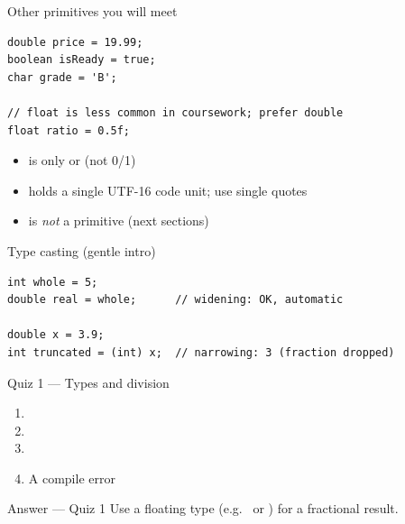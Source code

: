 \documentclass[aspectratio=169,11pt]{beamer}
\begin{document}
    \begin{frame}[fragile]{Other primitives you will meet}
        \begin{lstlisting}
double price = 19.99;
boolean isReady = true;
char grade = 'B';

// float is less common in coursework; prefer double
float ratio = 0.5f;
        \end{lstlisting}
        \vspace{0.3em}
        \begin{itemize}
            \item {} is only  or  (not 0/1)
            \item {} holds a single UTF-16 code unit; use single quotes
            \item {} is \emph{not} a primitive (next sections)
        \end{itemize}
    \end{frame}

    \begin{frame}[fragile]{Type casting (gentle intro)}
        \begin{lstlisting}
int whole = 5;
double real = whole;      // widening: OK, automatic

double x = 3.9;
int truncated = (int) x;  // narrowing: 3 (fraction dropped)
        \end{lstlisting}
        \vspace{0.3em}
    \end{frame}

    \begin{frame}{Quiz 1 --- Types and division}
        \begin{enumerate}
            \item {}
            \item {}
            \item {}
            \item A compile error
        \end{enumerate}
        \quizpause
    \end{frame}

    \begin{frame}{Answer --- Quiz 1}
        \vspace{0.4em}
        Use a floating type (e.g.\  or ) for a fractional result.
    \end{frame}
\end{document}
